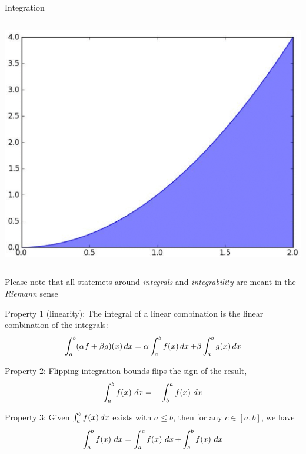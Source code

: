\begin{frame}{Integration}
\begin{columns}[onlytextwidth]
\begin{column}{0.2\textwidth}
            \includegraphics[width=1\textwidth]{fig/riemann-7.eps}
        \end{column}
    \end{columns}
    \vfill
    {
        \tiny
        Please note that all statemets around \emph{integrals} and \emph{integrability} are meant in the \emph{Riemann} sense
    }
\end{frame}
\begin{frame}
    Property 1 (linearity): The integral of a linear combination is the linear combination of the integrals:
    $$\int_a^b (\alpha f + \beta g)(x) \mathop{dx} = \alpha \int_a^b f(x) \mathop{dx} + \beta \int_a^b g(x) \mathop{dx}$$

    Property 2: Flipping integration bounds flips the sign of the result,
    $$\int_a^b f(x) \, \mathop{dx} = - \int_b^a f(x) \, \mathop{dx}$$

    Property 3: Given $\int_a^b f(x) \mathop{dx}$ exists with $a \leq b$, then for any $c \in [a, b]$, we have
    $$\int_a^b f(x) \, \mathop{dx} = \int_a^c f(x) \, \mathop{dx} + \int_c^b f(x) \, \mathop{dx}$$
\end{frame}

